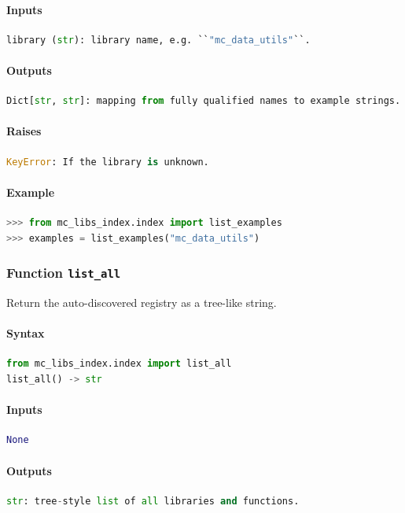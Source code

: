 \documentclass[11pt]{article}
\begin{document}
\paragraph{Inputs}
\begin{lstlisting}[language=Python]
library (str): library name, e.g. ``"mc_data_utils"``.
\end{lstlisting}
\paragraph{Outputs}
\begin{lstlisting}[language=Python]
Dict[str, str]: mapping from fully qualified names to example strings.
\end{lstlisting}
\paragraph{Raises}
\begin{lstlisting}[language=Python]
KeyError: If the library is unknown.
\end{lstlisting}
\paragraph{Example}
\begin{lstlisting}[language=Python]
>>> from mc_libs_index.index import list_examples
>>> examples = list_examples("mc_data_utils")
\end{lstlisting}

\subsubsection{Function \texttt{list\_all}}
Return the auto-discovered registry as a tree-like string.

\paragraph{Syntax}
\begin{lstlisting}[language=Python]
from mc_libs_index.index import list_all
list_all() -> str
\end{lstlisting}
\paragraph{Inputs}
\begin{lstlisting}[language=Python]
None
\end{lstlisting}
\paragraph{Outputs}
\begin{lstlisting}[language=Python]
str: tree-style list of all libraries and functions.
\end{lstlisting}
\end{document}
